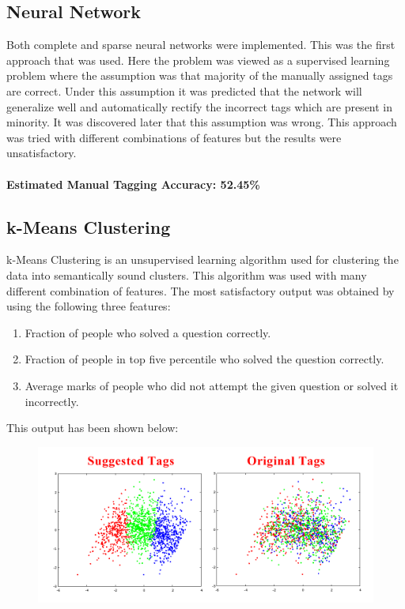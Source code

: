 \documentclass[12pt]{article}
\begin{document}
	\subsection{Neural Network}
	Both complete and sparse neural networks were implemented. This was
	the first approach that was used. Here the problem was viewed as a 
	supervised learning problem where the assumption was that majority of
	the manually assigned tags are correct. Under this assumption it was
	predicted that the network will generalize well and automatically rectify
	the incorrect tags which are present in minority.
	It was discovered later that this assumption was wrong. This approach
	was tried with different combinations of features but the results were
	unsatisfactory. 
	
	\paragraph{Estimated Manual Tagging Accuracy: 52.45\%}
	
	
	\subsection{k-Means Clustering}
	k-Means Clustering is an unsupervised learning algorithm used for
	clustering the data into semantically sound clusters. This algorithm
	was used with many different combination of features. The most satisfactory
	output was obtained by using the following three features:
	\begin{enumerate}
	\item Fraction of people who solved a question correctly.
	\item Fraction of people in top five percentile who solved the question
	correctly.
	\item Average marks of people who did not attempt the given question or
	solved it incorrectly.
	\end{enumerate}
	
	This output has been shown below:
	\begin{figure}[h]
	\includegraphics[width=\textwidth]{ClusteringOutput}
	\end{figure}
	
\end{document}
